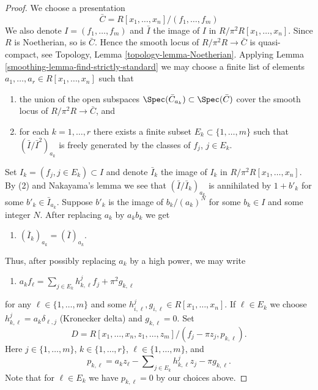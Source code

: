 \begin{proof}

We choose a presentation
$$
\bar C = R[x_1, \ldots, x_n]/(f_1, \ldots, f_m)
$$
We also denote $I = (f_1, \ldots, f_m)$ and $\bar I$ the image of
$I$ in $R/\pi^2R[x_1, \ldots, x_n]$. Since $R$ is Noetherian, so is
$\bar C$. Hence the smooth locus of $R/\pi^2 R \to \bar C$
is quasi-compact, see
Topology, Lemma \ref{topology-lemma-Noetherian}.
Applying
Lemma \ref{smoothing-lemma-find-strictly-standard}
we may choose a finite list of elements
$a_1, \ldots, a_r \in R[x_1, \ldots, x_n]$ such that
\begin{enumerate}
\item the union of the open subspaces
$\Spec(\bar C_{a_k}) \subset \Spec(\bar C)$
cover the smooth locus of $R/\pi^2 R \to \bar C$, and
\item for each $k = 1, \ldots, r$ there exists a finite subset
$E_k \subset \{1, \ldots, m\}$ such that
$(\bar I/\bar I^2)_{a_k}$ is freely generated by the classes of
$f_j$, $j \in E_k$.
\end{enumerate}
Set $I_k = (f_j, j \in E_k) \subset I$ and denote $\bar I_k$ the
image of $I_k$ in $R/\pi^2R[x_1, \ldots, x_n]$.
By (2) and Nakayama's lemma we see that $(\bar I/\bar I_k)_{a_k}$
is annihilated by $1 + b'_k$ for some $b'_k \in \bar I_{a_k}$.
Suppose $b'_k$ is the image of $b_k/(a_k)^N$ for some $b_k \in I$
and some integer $N$. After replacing $a_k$ by $a_kb_k$ we get
\begin{enumerate}
\item[(3)] $(\bar I_k)_{a_k} = (\bar I)_{a_k}$.
\end{enumerate}
Thus, after possibly replacing $a_k$ by a high power, we may write
\begin{enumerate}
\item[(4)]
$a_k f_\ell = \sum\nolimits_{j \in E_k} h_{k, \ell}^jf_j + \pi^2 g_{k, \ell}$
\end{enumerate}
for any $\ell \in \{1, \ldots, m\}$ and some
$h_{i, \ell}^j, g_{i, \ell} \in R[x_1, \ldots, x_n]$.
If $\ell \in E_k$ we choose $h_{k, \ell}^j = a_k\delta_{\ell, j}$
(Kronecker delta) and $g_{k, \ell} = 0$. Set
$$
D = R[x_1, \ldots, x_n, z_1, \ldots, z_m]/
(f_j - \pi z_j, p_{k, \ell}).
$$
Here $j \in \{1, \ldots, m\}$, $k \in \{1, \ldots, r\}$,
$\ell \in \{1, \ldots, m\}$, and
$$
p_{k, \ell} = a_k z_\ell - \sum\nolimits_{j \in E_k} h_{k, \ell}^j z_j
- \pi g_{k, \ell}.
$$
Note that for $\ell \in E_k$ we have $p_{k, \ell} = 0$ by our choices above.


\end{proof}

